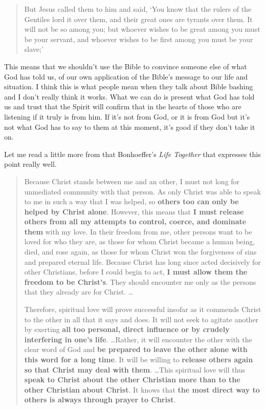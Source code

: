 \begin{quote}
    But Jesus called them to him and said, `You know that the rulers of the
    Gentiles lord it over them, and their great ones are tyrants over them. It
    will not be so among you; but whoever wishes to be great among you must be
    your servant, and whoever wishes to be first among you must be your slave;'
\end{quote}

This means that we shouldn't use the Bible to convince someone else of what God
has told us, of our own application of the Bible's message to our life and
situation. I think this is what people mean when they talk about Bible bashing
and I don't really think it works. What we can do is present what God has told
us and trust that the Spirit will confirm that in the hearts of those who are
listening if it truly is from him. If it's not from God, or it is from God but
it's not what God has to say to them at this moment, it's good if they don't
take it on.

Let me read a little more from that Bonhoeffer's \textit{Life Together} that
expresses this point really well.

\begin{quote}
    Because Christ stands between me and an other, I must not long for
    unmediated community with that person. As only Christ was able to speak to
    me in such a way that I was helped, so \textbf{others too can only be helped
    by Christ alone}. However, this means that \textbf{I must release others
    from all my attempts to control, coerce, and dominate them} with my love. In
    their freedom from me, other persons want to be loved for who they are, as
    those for whom Christ became a human being, died, and rose again, as those
    for whom Christ won the forgiveness of sins and prepared eternal life.
    Because Christ has long since acted decisively for other Christians, before
    I could begin to act, \textbf{I must allow them the freedom to be Christ's}.
    They should encounter me only as the persons that they already are for
    Christ. \dots

    Therefore, spiritual love will prove successful insofar as it commends
    Christ to the other in all that it says and does. It will not seek to
    agitate another by exerting \textbf{all too personal, direct influence or by
    crudely interfering in one's life}. \dots Rather, it will encounter the
    other with the clear word of God and \textbf{be prepared to leave the other
    alone with this word for a long time}. It will be willing to \textbf{release
    others again so that Christ may deal with them}. \dots This spiritual love
    will thus \textbf{speak to Christ about the other Christian more than to the
    other Christian about Christ}. It knows that \textbf{the most direct way to
    others is always through prayer to Christ}.
\end{quote}

